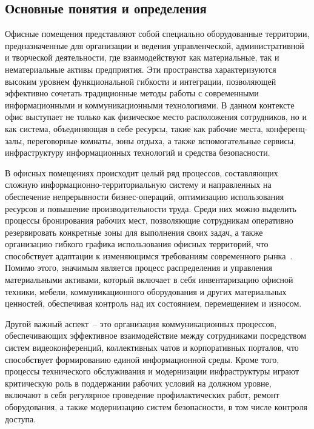 \subsection{Основные понятия и определения}
\label{sub:domain:basic-concepts}

Офисные помещения представляют собой специально оборудованные территории, предназначенные для организации и ведения управленческой, административной и творческой деятельности, где взаимодействуют как материальные, так и нематериальные активы предприятия. Эти пространства характеризуются высоким уровнем функциональной гибкости и интеграции, позволяющей эффективно сочетать традиционные методы работы с современными информационными и коммуникационными технологиями. В данном контексте офис выступает не только как физическое место расположения сотрудников, но и как система, объединяющая в себе ресурсы, такие как рабочие места, конференц-залы, переговорные комнаты, зоны отдыха, а также вспомогательные сервисы, инфраструктуру информационных технологий и средства безопасности.

В офисных помещениях происходит целый ряд процессов, составляющих сложную информационно-территориальную систему и направленных на обеспечение непрерывности бизнес-операций, оптимизацию использования ресурсов и повышение производительности труда. Среди них можно выделить процессы бронирования рабочих мест, позволяющие сотрудникам оперативно резервировать конкретные зоны для выполнения своих задач, а также организацию гибкого графика использования офисных территорий, что способствует адаптации к изменяющимся требованиям современного рынка~\cite{web_automatization_of_operational_processes_in_company}. Помимо этого, значимым является процесс распределения и управления материальными активами, который включает в себя инвентаризацию офисной техники, мебели, коммуникационного оборудования и других материальных ценностей, обеспечивая контроль над их состоянием, перемещением и износом.

Другой важный аспект~-- это организация коммуникационных процессов, обеспечивающих эффективное взаимодействие между сотрудниками посредством систем видеоконференций, коллективных чатов и корпоративных порталов, что способствует формированию единой информационной среды. Кроме того, процессы технического обслуживания и модернизации инфраструктуры играют критическую роль в поддержании рабочих условий на должном уровне, включают в себя регулярное проведение профилактических работ, ремонт оборудования, а также модернизацию систем безопасности, в том числе контроля доступа.

